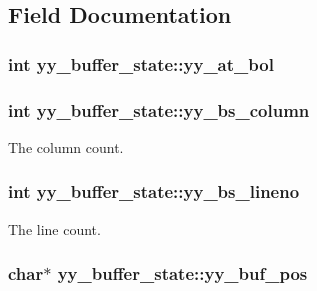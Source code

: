 \subsection{Field Documentation}
\hypertarget{structyy__buffer__state_a9d60c60af6e1a6f69de16871fd64f85f}{
\subsubsection[{yy\+\_\+at\+\_\+bol}]{\setlength{\rightskip}{0pt plus 5cm}int yy\+\_\+buffer\+\_\+state\+::yy\+\_\+at\+\_\+bol}}\label{structyy__buffer__state_a9d60c60af6e1a6f69de16871fd64f85f}
\hypertarget{structyy__buffer__state_a10c4fcd8be759e6bf11e6d3e8cdb0307}{
\subsubsection[{yy\+\_\+bs\+\_\+column}]{\setlength{\rightskip}{0pt plus 5cm}int yy\+\_\+buffer\+\_\+state\+::yy\+\_\+bs\+\_\+column}}\label{structyy__buffer__state_a10c4fcd8be759e6bf11e6d3e8cdb0307}
The column count. \hypertarget{structyy__buffer__state_a818e94bc9c766e683c60df1e9fd01199}{
\subsubsection[{yy\+\_\+bs\+\_\+lineno}]{\setlength{\rightskip}{0pt plus 5cm}int yy\+\_\+buffer\+\_\+state\+::yy\+\_\+bs\+\_\+lineno}}\label{structyy__buffer__state_a818e94bc9c766e683c60df1e9fd01199}
The line count. \hypertarget{structyy__buffer__state_a58aa927f098b99d99e75da80f9b681ef}{
\subsubsection[{yy\+\_\+buf\+\_\+pos}]{\setlength{\rightskip}{0pt plus 5cm}char$\ast$ yy\+\_\+buffer\+\_\+state\+::yy\+\_\+buf\+\_\+pos}}\label{structyy__buffer__state_a58aa927f098b99d99e75da80f9b681ef}
